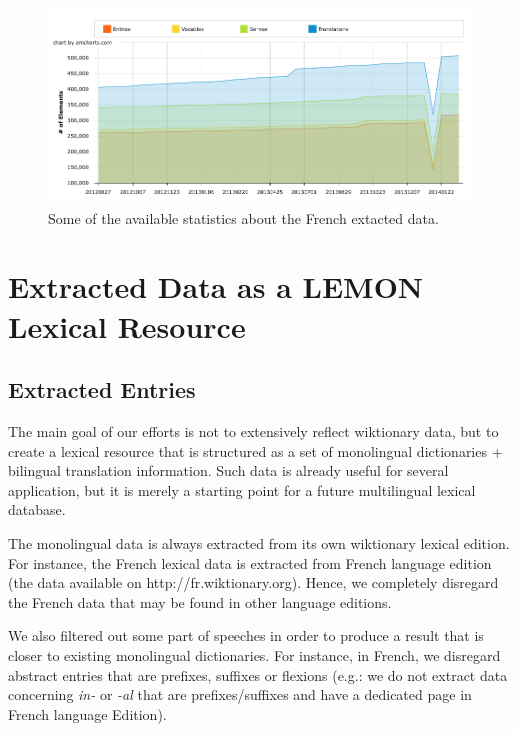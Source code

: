 \documentclass[10pt, a4paper]{article}
\begin{document}
\begin{figure}[htb]
	\begin{center}
		\includegraphics[width=\textwidth]{french.png}
	\end{center}
	\caption{Some of the available statistics about the French extacted data.}
	\label{fig:figure2}
\end{figure}

\section{Extracted Data as a LEMON Lexical Resource}

\subsection{Extracted Entries}

The main goal of our efforts is not to extensively reflect wiktionary data, but to create a lexical resource that is structured as a set of monolingual dictionaries + bilingual translation information. Such data is already useful for several application, but it is merely a starting point for a future multilingual lexical database.

The monolingual data is always extracted from its own wiktionary lexical edition. For instance, the French lexical data is extracted from French language edition (the data available on http://fr.wiktionary.org). Hence, we completely disregard the French data that may be found in other language editions.

We also filtered out some part of speeches in order to produce a result that is closer to existing monolingual dictionaries. For instance, in French, we disregard abstract entries that are prefixes, suffixes or flexions (e.g.: we do not extract data concerning \textit{in-} or \textit{-al} that are prefixes/suffixes and have a dedicated page in French language Edition). 
\end{document}
